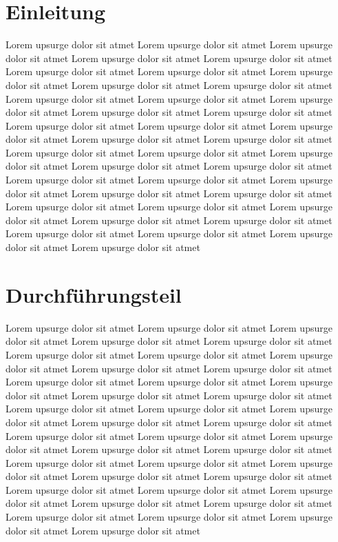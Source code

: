 \documentclass[12pt, a4paper]{article}
\begin{document}
\section{Einleitung}

Lorem upsurge dolor sit atmet Lorem upsurge dolor sit atmet Lorem upsurge dolor sit atmet Lorem upsurge dolor sit atmet Lorem upsurge dolor sit atmet Lorem upsurge dolor sit atmet Lorem upsurge dolor sit atmet Lorem upsurge dolor sit atmet Lorem upsurge dolor sit atmet Lorem upsurge dolor sit atmet Lorem upsurge dolor sit atmet Lorem upsurge dolor sit atmet Lorem upsurge dolor sit atmet Lorem upsurge dolor sit atmet Lorem upsurge dolor sit atmet Lorem upsurge dolor sit atmet Lorem upsurge dolor sit atmet Lorem upsurge dolor sit atmet Lorem upsurge dolor sit atmet Lorem upsurge dolor sit atmet Lorem upsurge dolor sit atmet Lorem upsurge dolor sit atmet Lorem upsurge dolor sit atmet Lorem upsurge dolor sit atmet Lorem upsurge dolor sit atmet Lorem upsurge dolor sit atmet Lorem upsurge dolor sit atmet Lorem upsurge dolor sit atmet Lorem upsurge dolor sit atmet Lorem upsurge dolor sit atmet Lorem upsurge dolor sit atmet Lorem upsurge dolor sit atmet Lorem upsurge dolor sit atmet Lorem upsurge dolor sit atmet Lorem upsurge dolor sit atmet Lorem upsurge dolor sit atmet Lorem upsurge dolor sit atmet Lorem upsurge dolor sit atmet Lorem upsurge dolor sit atmet

\section{Durchführungsteil}

Lorem upsurge dolor sit atmet Lorem upsurge dolor sit atmet Lorem upsurge dolor sit atmet Lorem upsurge dolor sit atmet Lorem upsurge dolor sit atmet Lorem upsurge dolor sit atmet Lorem upsurge dolor sit atmet Lorem upsurge dolor sit atmet Lorem upsurge dolor sit atmet Lorem upsurge dolor sit atmet Lorem upsurge dolor sit atmet Lorem upsurge dolor sit atmet Lorem upsurge dolor sit atmet Lorem upsurge dolor sit atmet Lorem upsurge dolor sit atmet Lorem upsurge dolor sit atmet Lorem upsurge dolor sit atmet Lorem upsurge dolor sit atmet Lorem upsurge dolor sit atmet Lorem upsurge dolor sit atmet Lorem upsurge dolor sit atmet Lorem upsurge dolor sit atmet Lorem upsurge dolor sit atmet Lorem upsurge dolor sit atmet Lorem upsurge dolor sit atmet Lorem upsurge dolor sit atmet Lorem upsurge dolor sit atmet Lorem upsurge dolor sit atmet Lorem upsurge dolor sit atmet Lorem upsurge dolor sit atmet Lorem upsurge dolor sit atmet Lorem upsurge dolor sit atmet Lorem upsurge dolor sit atmet Lorem upsurge dolor sit atmet Lorem upsurge dolor sit atmet Lorem upsurge dolor sit atmet Lorem upsurge dolor sit atmet Lorem upsurge dolor sit atmet Lorem upsurge dolor sit atmet 
\end{document}
